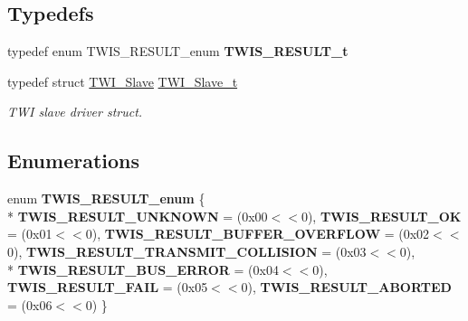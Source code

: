 \subsection*{Typedefs}
\begin{DoxyCompactItemize}
\item 
\hypertarget{group__group__xmega__drivers__twi__twis_ga036675f5b6136f27e7528086051dd4e0}{typedef enum T\-W\-I\-S\-\_\-\-R\-E\-S\-U\-L\-T\-\_\-enum {\bfseries T\-W\-I\-S\-\_\-\-R\-E\-S\-U\-L\-T\-\_\-t}}\label{group__group__xmega__drivers__twi__twis_ga036675f5b6136f27e7528086051dd4e0}

\item 
typedef struct \hyperlink{struct_t_w_i___slave}{T\-W\-I\-\_\-\-Slave} \hyperlink{group__group__xmega__drivers__twi__twis_gabf4af194b6abde4d5fce8ded2aa33c18}{T\-W\-I\-\_\-\-Slave\-\_\-t}
\begin{DoxyCompactList}\small\item\em T\-W\-I slave driver struct. \end{DoxyCompactList}\end{DoxyCompactItemize}
\subsection*{Enumerations}
\begin{DoxyCompactItemize}
\item 
enum {\bfseries T\-W\-I\-S\-\_\-\-R\-E\-S\-U\-L\-T\-\_\-enum} \{ \\*
{\bfseries T\-W\-I\-S\-\_\-\-R\-E\-S\-U\-L\-T\-\_\-\-U\-N\-K\-N\-O\-W\-N} =  (0x00$<$$<$0), 
{\bfseries T\-W\-I\-S\-\_\-\-R\-E\-S\-U\-L\-T\-\_\-\-O\-K} =  (0x01$<$$<$0), 
{\bfseries T\-W\-I\-S\-\_\-\-R\-E\-S\-U\-L\-T\-\_\-\-B\-U\-F\-F\-E\-R\-\_\-\-O\-V\-E\-R\-F\-L\-O\-W} =  (0x02$<$$<$0), 
{\bfseries T\-W\-I\-S\-\_\-\-R\-E\-S\-U\-L\-T\-\_\-\-T\-R\-A\-N\-S\-M\-I\-T\-\_\-\-C\-O\-L\-L\-I\-S\-I\-O\-N} =  (0x03$<$$<$0), 
\\*
{\bfseries T\-W\-I\-S\-\_\-\-R\-E\-S\-U\-L\-T\-\_\-\-B\-U\-S\-\_\-\-E\-R\-R\-O\-R} =  (0x04$<$$<$0), 
{\bfseries T\-W\-I\-S\-\_\-\-R\-E\-S\-U\-L\-T\-\_\-\-F\-A\-I\-L} =  (0x05$<$$<$0), 
{\bfseries T\-W\-I\-S\-\_\-\-R\-E\-S\-U\-L\-T\-\_\-\-A\-B\-O\-R\-T\-E\-D} =  (0x06$<$$<$0)
 \}
\end{DoxyCompactItemize}
